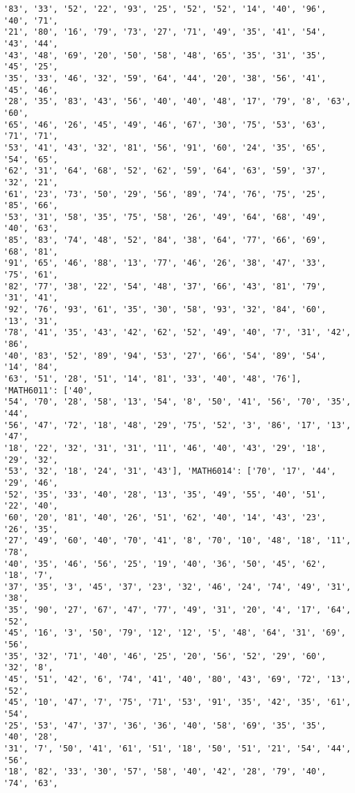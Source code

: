 \documentclass[11pt]{article}
\begin{document}
\begin{Verbatim}[commandchars=\\\{\}]
'83', '33', '52', '22', '93', '25', '52', '52', '14', '40', '96', '40', '71',
'21', '80', '16', '79', '73', '27', '71', '49', '35', '41', '54', '43', '44',
'43', '48', '69', '20', '50', '58', '48', '65', '35', '31', '35', '45', '25',
'35', '33', '46', '32', '59', '64', '44', '20', '38', '56', '41', '45', '46',
'28', '35', '83', '43', '56', '40', '40', '48', '17', '79', '8', '63', '60',
'65', '46', '26', '45', '49', '46', '67', '30', '75', '53', '63', '71', '71',
'53', '41', '43', '32', '81', '56', '91', '60', '24', '35', '65', '54', '65',
'62', '31', '64', '68', '52', '62', '59', '64', '63', '59', '37', '32', '21',
'61', '23', '73', '50', '29', '56', '89', '74', '76', '75', '25', '85', '66',
'53', '31', '58', '35', '75', '58', '26', '49', '64', '68', '49', '40', '63',
'85', '83', '74', '48', '52', '84', '38', '64', '77', '66', '69', '68', '81',
'91', '65', '46', '88', '13', '77', '46', '26', '38', '47', '33', '75', '61',
'82', '77', '38', '22', '54', '48', '37', '66', '43', '81', '79', '31', '41',
'92', '76', '93', '61', '35', '30', '58', '93', '32', '84', '60', '13', '31',
'78', '41', '35', '43', '42', '62', '52', '49', '40', '7', '31', '42', '86',
'40', '83', '52', '89', '94', '53', '27', '66', '54', '89', '54', '14', '84',
'63', '51', '28', '51', '14', '81', '33', '40', '48', '76'], 'MATH6011': ['40',
'54', '70', '28', '58', '13', '54', '8', '50', '41', '56', '70', '35', '44',
'56', '47', '72', '18', '48', '29', '75', '52', '3', '86', '17', '13', '47',
'18', '22', '32', '31', '31', '11', '46', '40', '43', '29', '18', '29', '32',
'53', '32', '18', '24', '31', '43'], 'MATH6014': ['70', '17', '44', '29', '46',
'52', '35', '33', '40', '28', '13', '35', '49', '55', '40', '51', '22', '40',
'60', '20', '81', '40', '26', '51', '62', '40', '14', '43', '23', '26', '35',
'27', '49', '60', '40', '70', '41', '8', '70', '10', '48', '18', '11', '78',
'40', '35', '46', '56', '25', '19', '40', '36', '50', '45', '62', '18', '7',
'37', '35', '3', '45', '37', '23', '32', '46', '24', '74', '49', '31', '38',
'35', '90', '27', '67', '47', '77', '49', '31', '20', '4', '17', '64', '52',
'45', '16', '3', '50', '79', '12', '12', '5', '48', '64', '31', '69', '56',
'35', '32', '71', '40', '46', '25', '20', '56', '52', '29', '60', '32', '8',
'45', '51', '42', '6', '74', '41', '40', '80', '43', '69', '72', '13', '52',
'45', '10', '47', '7', '75', '71', '53', '91', '35', '42', '35', '61', '54',
'25', '53', '47', '37', '36', '36', '40', '58', '69', '35', '35', '40', '28',
'31', '7', '50', '41', '61', '51', '18', '50', '51', '21', '54', '44', '56',
'18', '82', '33', '30', '57', '58', '40', '42', '28', '79', '40', '74', '63',

\end{Verbatim}
\end{document}
